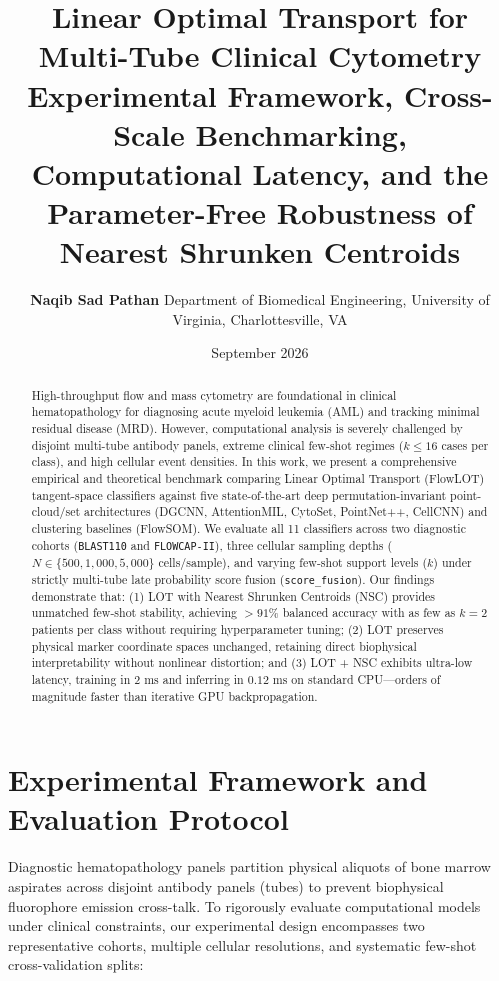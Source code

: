 \documentclass[10pt]{article}
\title{\textbf{\LARGE Linear Optimal Transport for Multi-Tube Clinical Cytometry}\\[0.3em]
\Large Experimental Framework, Cross-Scale Benchmarking, Computational Latency, and the Parameter-Free Robustness of Nearest Shrunken Centroids}
\author{\textbf{Naqib Sad Pathan} \quad Department of Biomedical Engineering, University of Virginia, Charlottesville, VA}
\date{September 2026}
\begin{document}
\maketitle
\vspace{-1.2em}

\begin{abstract}
\noindent
High-throughput flow and mass cytometry are foundational in clinical hematopathology for diagnosing acute myeloid leukemia (AML) and tracking minimal residual disease (MRD). However, computational analysis is severely challenged by disjoint multi-tube antibody panels, extreme clinical few-shot regimes ($k \le 16$ cases per class), and high cellular event densities. In this work, we present a comprehensive empirical and theoretical benchmark comparing Linear Optimal Transport (FlowLOT) tangent-space classifiers against five state-of-the-art deep permutation-invariant point-cloud/set architectures (DGCNN, AttentionMIL, CytoSet, PointNet++, CellCNN) and clustering baselines (FlowSOM). We evaluate all 11 classifiers across two diagnostic cohorts (\texttt{BLAST110} and \texttt{FLOWCAP-II}), three cellular sampling depths ($N \in \{500, 1{,}000, 5{,}000\}$ cells/sample), and varying few-shot support levels ($k$) under strictly multi-tube late probability score fusion (\texttt{score\_fusion}). Our findings demonstrate that: (1) LOT with Nearest Shrunken Centroids (NSC) provides unmatched few-shot stability, achieving $>91\%$ balanced accuracy with as few as $k=2$ patients per class without requiring hyperparameter tuning; (2) LOT preserves physical marker coordinate spaces unchanged, retaining direct biophysical interpretability without nonlinear distortion; and (3) LOT + NSC exhibits ultra-low latency, training in $2\text{ ms}$ and inferring in $0.12\text{ ms}$ on standard CPU---orders of magnitude faster than iterative GPU backpropagation.
\end{abstract}

\vspace{0.4em}

\section{Experimental Framework and Evaluation Protocol}
Diagnostic hematopathology panels partition physical aliquots of bone marrow aspirates across disjoint antibody panels (tubes) to prevent biophysical fluorophore emission cross-talk. To rigorously evaluate computational models under clinical constraints, our experimental design encompasses two representative cohorts, multiple cellular resolutions, and systematic few-shot cross-validation splits:
\end{document}
